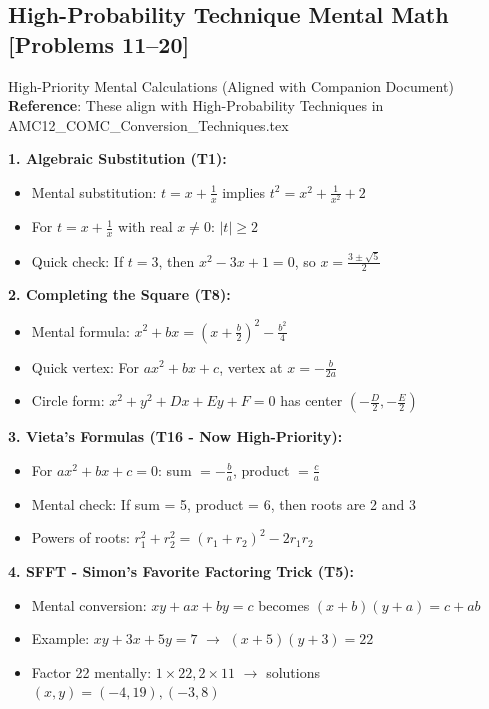 \documentclass{article}
\begin{document}
\subsection{High-Probability Technique Mental Math [Problems 11--20]}

\begin{mentalbox}{High-Priority Mental Calculations (Aligned with Companion Document)}
\textbf{Reference}: These align with High-Probability Techniques in AMC12\_COMC\_Conversion\_Techniques.tex

\textbf{1. Algebraic Substitution (T1):}
\begin{itemize}[nosep]
\item Mental substitution: $t = x + \frac{1}{x}$ implies $t^2 = x^2 + \frac{1}{x^2} + 2$
\item For $t = x + \frac{1}{x}$ with real $x \neq 0$: $|t| \geq 2$
\item Quick check: If $t = 3$, then $x^2 - 3x + 1 = 0$, so $x = \frac{3 \pm \sqrt{5}}{2}$
\end{itemize}

\textbf{2. Completing the Square (T8):}
\begin{itemize}[nosep]
\item Mental formula: $x^2 + bx = (x + \frac{b}{2})^2 - \frac{b^2}{4}$
\item Quick vertex: For $ax^2 + bx + c$, vertex at $x = -\frac{b}{2a}$
\item Circle form: $x^2 + y^2 + Dx + Ey + F = 0$ has center $(-\frac{D}{2}, -\frac{E}{2})$
\end{itemize}

\textbf{3. Vieta's Formulas (T16 - Now High-Priority):}
\begin{itemize}[nosep]
\item For $ax^2 + bx + c = 0$: sum $= -\frac{b}{a}$, product $= \frac{c}{a}$
\item Mental check: If sum = 5, product = 6, then roots are 2 and 3
\item Powers of roots: $r_1^2 + r_2^2 = (r_1 + r_2)^2 - 2r_1r_2$
\end{itemize}

\textbf{4. SFFT - Simon's Favorite Factoring Trick (T5):}
\begin{itemize}[nosep]
\item Mental conversion: $xy + ax + by = c$ becomes $(x+b)(y+a) = c + ab$
\item Example: $xy + 3x + 5y = 7$ $\rightarrow$ $(x+5)(y+3) = 22$
\item Factor 22 mentally: $1\times22, 2\times11$ $\rightarrow$ solutions $(x,y) = (-4,19), (-3,8)$
\end{itemize}


\end{mentalbox}
\end{document}
